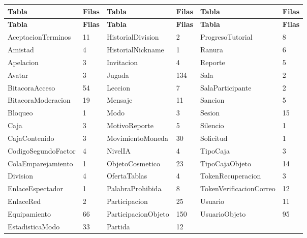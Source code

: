 \begin{center}\footnotesize\setlength{\tabcolsep}{2pt}
\begin{longtable}{|L{113.4pt}|L{32.0pt}|L{103.8pt}|L{32.0pt}|L{131.3pt}|L{32.0pt}|}
\hline
\textbf{\hspace{0pt}Tabla} & \textbf{\hspace{0pt}Filas} & \textbf{\hspace{0pt}Tabla} & \textbf{\hspace{0pt}Filas} & \textbf{\hspace{0pt}Tabla} & \textbf{\hspace{0pt}Filas} \\ \hline
\endfirsthead
\hline
\textbf{\hspace{0pt}Tabla} & \textbf{\hspace{0pt}Filas} & \textbf{\hspace{0pt}Tabla} & \textbf{\hspace{0pt}Filas} & \textbf{\hspace{0pt}Tabla} & \textbf{\hspace{0pt}Filas} \\ \hline
\endhead
AceptacionTerminos & 11 & HistorialDivision & 2 & ProgresoTutorial & 8 \\ \hline
Amistad & 4 & HistorialNickname & 1 & Ranura & 6 \\ \hline
Apelacion & 3 & Invitacion & 4 & Reporte & 5 \\ \hline
Avatar & 3 & Jugada & 134 & Sala & 2 \\ \hline
BitacoraAcceso & 54 & Leccion & 7 & SalaParticipante & 2 \\ \hline
BitacoraModeracion & 19 & Mensaje & 11 & Sancion & 5 \\ \hline
Bloqueo & 1 & Modo & 3 & Sesion & 15 \\ \hline
Caja & 3 & MotivoReporte & 5 & Silencio & 1 \\ \hline
CajaContenido & 3 & MovimientoMoneda & 30 & Solicitud & 1 \\ \hline
CodigoSegundoFactor & 4 & NivelIA & 4 & TipoCaja & 3 \\ \hline
ColaEmparejamiento & 1 & ObjetoCosmetico & 23 & TipoCajaObjeto & 14 \\ \hline
Division & 4 & OfertaTablas & 4 & TokenRecuperacion & 3 \\ \hline
EnlaceEspectador & 1 & PalabraProhibida & 8 & TokenVerificacionCorreo & 12 \\ \hline
EnlaceRed & 2 & Participacion & 25 & Usuario & 11 \\ \hline
Equipamiento & 66 & ParticipacionObjeto & 150 & UsuarioObjeto & 95 \\ \hline
EstadisticaModo & 33 & Partida & 12 &  &  \\ \hline
\end{longtable}
\end{center}
